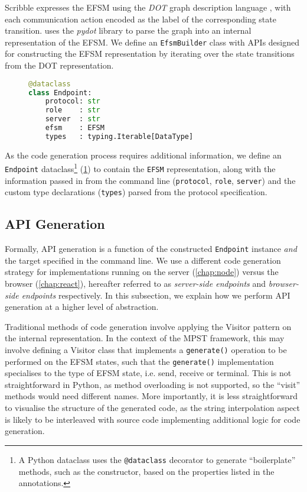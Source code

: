 Scribble expresses the EFSM using the 
\textit{DOT} graph description language \cite{dot}, 
with each
communication action encoded as the label of the corresponding
state transition. 
\codegen uses the \textit{pydot} library \cite{pydot}
to parse the graph into an internal representation of the EFSM.
We define an \texttt{EfsmBuilder} class with APIs designed for
constructing the EFSM representation by iterating over the 
state transitions from the DOT representation.

\begin{figure}[!ht]
\begin{lstlisting}[language=Python]
@dataclass
class Endpoint:
    protocol: str
    role    : str
    server  : str
    efsm    : EFSM
    types   : typing.Iterable[DataType]
\end{lstlisting}
\label{lst:endpointapi}
\end{figure}

As the code generation process requires additional information,
we define an \texttt{Endpoint} dataclass\footnote{
A Python dataclass uses the \texttt{@dataclass} decorator to generate
``boilerplate'' methods, such as the constructor, based on the
properties listed in the annotations.} (\cref{lst:endpointapi})
to contain the \texttt{EFSM}
representation, along with the information passed in from the
command line (\texttt{protocol}, \texttt{role}, \texttt{server}) 
and the custom type declarations (\texttt{types}) parsed from the
protocol specification.

\subsection{API Generation}
\label{subsection:apigen}

Formally, API generation is a function of the constructed
\texttt{Endpoint} instance
\textit{and} the target specified in the command line. We use a 
different code generation strategy for implementations running on
the server (\cref{chap:node}) versus the browser (\cref{chap:react}),
hereafter referred to as \textit{server-side endpoints} and 
\textit{browser-side endpoints} respectively.
In this subsection, we explain how we perform API generation
at a higher level of abstraction.

Traditional methods of code generation involve applying the
Visitor pattern on the internal representation. 
In the context of the MPST framework,
this may involve defining a Visitor class that implements a
\texttt{generate()} operation to be performed on the EFSM states,
such that the \texttt{generate()} implementation specialises to the
type of EFSM state, i.e. send, receive or terminal.
This is not straightforward in Python, as method overloading is not 
supported, so the ``visit'' methods would need different names.
More importantly, it is less straightforward to visualise
the structure of the generated code, as the string interpolation
aspect is likely to be interleaved with source code implementing
additional logic for code generation.

